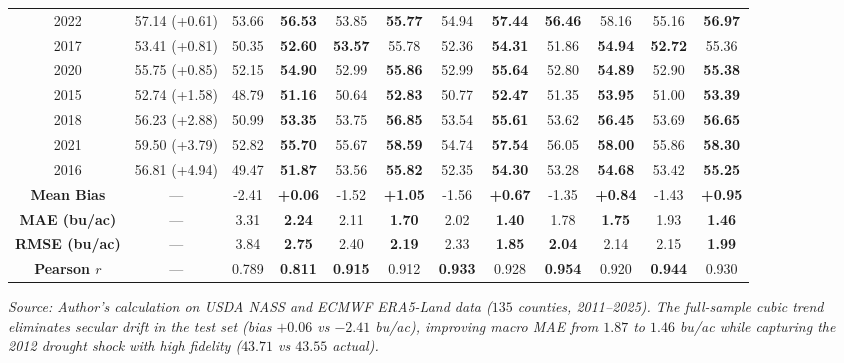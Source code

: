 \begin{table}[htbp]
\begin{tabular*}{\textwidth}{@{\extracolsep{\fill}} c c cc cc cc cc cc @{}}
2022 & 57.14 {\tiny (+0.61)} & 53.66 & \textbf{56.53} & 53.85 & \textbf{55.77} & 54.94 & \textbf{57.44} & \textbf{56.46} & 58.16 & 55.16 & \textbf{56.97} \\
2017 & 53.41 {\tiny (+0.81)} & 50.35 & \textbf{52.60} & \textbf{53.57} & 55.78 & 52.36 & \textbf{54.31} & 51.86 & \textbf{54.94} & \textbf{52.72} & 55.36 \\
2020 & 55.75 {\tiny (+0.85)} & 52.15 & \textbf{54.90} & 52.99 & \textbf{55.86} & 52.99 & \textbf{55.64} & 52.80 & \textbf{54.89} & 52.90 & \textbf{55.38} \\
2015 & 52.74 {\tiny (+1.58)} & 48.79 & \textbf{51.16} & 50.64 & \textbf{52.83} & 50.77 & \textbf{52.47} & 51.35 & \textbf{53.95} & 51.00 & \textbf{53.39} \\
2018 & 56.23 {\tiny (+2.88)} & 50.99 & \textbf{53.35} & 53.75 & \textbf{56.85} & 53.54 & \textbf{55.61} & 53.62 & \textbf{56.45} & 53.69 & \textbf{56.65} \\
2021 & 59.50 {\tiny (+3.79)} & 52.82 & \textbf{55.70} & 55.67 & \textbf{58.59} & 54.74 & \textbf{57.54} & 56.05 & \textbf{58.00} & 55.86 & \textbf{58.30} \\
2016 & 56.81 {\tiny (+4.94)} & 49.47 & \textbf{51.87} & 53.56 & \textbf{55.82} & 52.35 & \textbf{54.30} & 53.28 & \textbf{54.68} & 53.42 & \textbf{55.25} \\
\midrule
\textbf{Mean Bias} & --- & -2.41 & \textbf{+0.06} & -1.52 & \textbf{+1.05} & -1.56 & \textbf{+0.67} & -1.35 & \textbf{+0.84} & -1.43 & \textbf{+0.95} \\
\textbf{MAE (bu/ac)} & --- & 3.31 & \textbf{2.24} & 2.11 & \textbf{1.70} & 2.02 & \textbf{1.40} & 1.78 & \textbf{1.75} & 1.93 & \textbf{1.46} \\
\textbf{RMSE (bu/ac)} & --- & 3.84 & \textbf{2.75} & 2.40 & \textbf{2.19} & 2.33 & \textbf{1.85} & \textbf{2.04} & 2.14 & 2.15 & \textbf{1.99} \\
\textbf{Pearson $r$} & --- & 0.789 & \textbf{0.811} & \textbf{0.915} & 0.912 & \textbf{0.933} & 0.928 & \textbf{0.954} & 0.920 & \textbf{0.944} & 0.930 \\
\bottomrule
\end{tabular*}
\vspace{0.2em}
{\footnotesize \textit{Source: Author's calculation on USDA NASS and ECMWF ERA5-Land data ($135$ counties, 2011--2025). The full-sample cubic trend eliminates secular drift in the test set (bias $+0.06$ vs $-2.41$ bu/ac), improving macro MAE from $1.87$ to $1.46$ bu/ac while capturing the 2012 drought shock with high fidelity ($43.71$ vs $43.55$ actual).}}
\end{table}